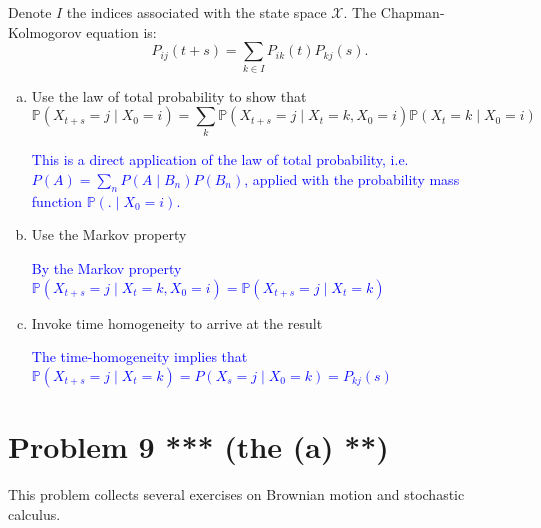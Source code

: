 \documentclass[11pt]{extarticle}
\theoremstyle{plain}
\theoremstyle{definition}
\begin{document}
Denote $I$ the indices associated with the state space $\mathcal X$. The Chapman-Kolmogorov equation is: 
\begin{equation*}
	P_{ij}(t+s) = \sum_{k \in I} P_{ik}(t) P_{kj}(s).
\end{equation*}

\begin{enumerate}[(a)]
\item Use the law of total probability to show that 
\begin{equation*}
	\mathbb P(X_{t+s} = j \mid X_0 = i) = \sum_k \mathbb P(X_{t+s} = j \mid X_t = k, X_0 = i) \mathbb P(X_t = k \mid X_0 = i) 
\end{equation*}

\textcolor{blue}{This is a direct application of the law of total probability, i.e. $P(A)=\sum_n P\left(A \mid B_n\right) P\left(B_n\right)$, applied with the probability mass function $\mathbb P( . \mid X_0 = i) $.}
\item Use the Markov property

\textcolor{blue}{By the Markov property $\mathbb P(X_{t+s} = j \mid X_t = k, X_0 = i)=\mathbb P(X_{t+s} = j \mid X_t = k)$}

\item Invoke time homogeneity to arrive at the result

\textcolor{blue}{The time-homogeneity implies that $\mathbb P(X_{t+s} = j \mid X_t = k)= P(X_{s} = j \mid X_0 = k)= P_{kj}(s)$}

\end{enumerate}



\vspace{10mm}
\section*{Problem 9 *** (the (a) **)}

This problem collects several exercises on Brownian motion and stochastic calculus.
\end{document}
